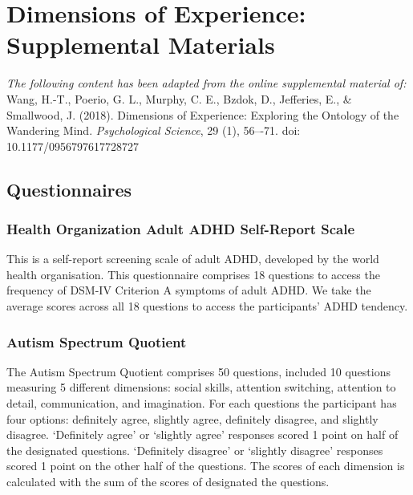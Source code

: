 
\appendix
\setcounter{chapter}{0}

\renewcommand{\chaptername}{Appendix}
\renewcommand{\theequation}{\Alph{chapter}.\arabic{section}.\arabic{equation}}
\setcounter{equation}{0}


\chapter{Dimensions of Experience: Supplemental Materials}
\label{appendix:study1}
\textit{The following content has been adapted from the online supplemental material of: }\\
Wang, H.-T., Poerio, G. L., Murphy, C. E., Bzdok, D., Jefferies, E., \& Smallwood, J. (2018). Dimensions of Experience: Exploring the Ontology of the Wandering Mind. \textit{Psychological Science}, 29 (1), 56–-71. doi: 10.1177/0956797617728727
\section{Questionnaires}
\label{appendix:study1:subsection1}

\subsection{Health Organization Adult ADHD Self-Report Scale}
This is a self-report screening scale of adult ADHD, developed by the world health organisation\cite{Kessler2005}. This questionnaire comprises 18 questions to access the frequency of DSM-IV Criterion A symptoms of adult ADHD. We take the average scores across all 18 questions to access the participants’ ADHD tendency.

\subsection{Autism Spectrum Quotient}
The Autism Spectrum Quotient \cite{Baron-Cohen2001} comprises 50 questions, included 10 questions measuring 5 different dimensions: social skills, attention switching, attention to detail, communication, and imagination. For each questions the participant has four options: definitely agree, slightly agree, definitely disagree, and slightly disagree. ‘Definitely agree’ or ‘slightly agree’ responses scored 1 point on half of the designated questions.  ‘Definitely disagree’ or ‘slightly disagree’ responses scored 1 point on the other half of the questions.  The scores of each dimension is calculated with the sum of the scores of designated the questions. 

